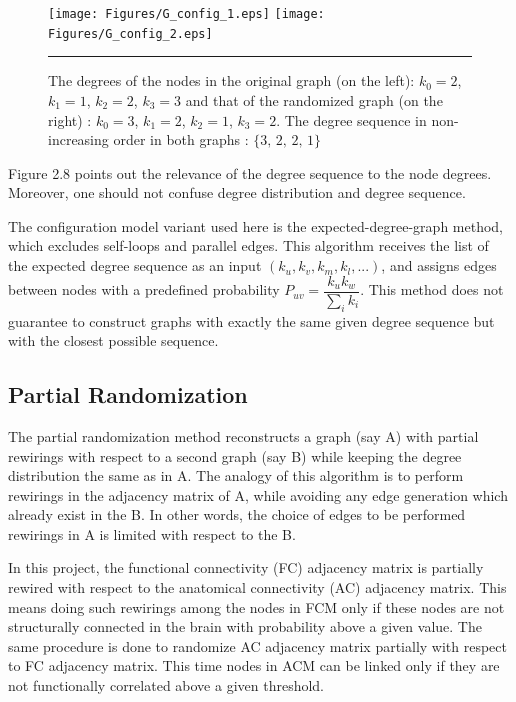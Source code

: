 \begin{figure}[htbp]
  \centering
	\texttt{[image: Figures/G\_config\_1.eps]}  
	\texttt{[image: Figures/G\_config\_2.eps]} 
    \rule{35em}{0.5pt}
    \caption[Degree Sequence Definition]{The degrees of the nodes in the original graph (on the left): $k_0 = 2$, $k_1 =1$, $k_2=2$, $k_3=3$ and that of the randomized graph (on the right) : $k_0 = 3$, $k_1 =2$, $k_2=1$, $k_3=2$. The degree sequence in non-increasing order in both graphs : $\{3,\,2,\,2,\,1\}$}
  \label{fig:Degree Sequence Definition}
\end{figure}

Figure 2.8 points out the relevance of the degree sequence to the node degrees. Moreover, one should not confuse degree distribution and degree sequence.   

The configuration model variant used here is the expected-degree-graph method, which excludes self-loops and parallel edges. This algorithm receives the list of the expected degree sequence as an input $(k_u, k_v, k_m, k_l, ...)$, and assigns edges between nodes with a predefined probability $P_{uv}=\dfrac{k_u k_w}{\sum_{i}k_i}$. This method does not guarantee to construct graphs with exactly the same given degree sequence but with the closest possible sequence.  



 
\subsection{Partial Randomization}
 
The partial randomization method  reconstructs a graph (say A) with partial rewirings with respect to a second graph (say B) while keeping the degree distribution the same as in A. The analogy of this algorithm is to perform rewirings in the adjacency matrix of A, while avoiding any edge generation which already exist in the B. In other words, the choice of edges to be performed rewirings in A is limited with respect to the B. 

In this project, the functional connectivity (FC) adjacency matrix is partially rewired with respect to the anatomical connectivity (AC) adjacency matrix.  This means doing such rewirings among the nodes in FCM only if these nodes are not structurally connected in the brain with probability above a given value. The same procedure is done to randomize AC adjacency matrix partially with respect to FC adjacency matrix.  This time nodes in ACM can be linked only if they are not functionally correlated above a given threshold.   

